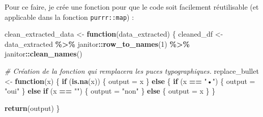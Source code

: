 \documentclass[
  french,
]{book}
\newenvironment{Shaded}{\begin{snugshade}}{\end{snugshade}}
\newcommand{\CommentTok}[1]{\textcolor[rgb]{0.56,0.35,0.01}{\textit{#1}}}
\newcommand{\ControlFlowTok}[1]{\textcolor[rgb]{0.13,0.29,0.53}{\textbf{#1}}}
\newcommand{\DecValTok}[1]{\textcolor[rgb]{0.00,0.00,0.81}{#1}}
\newcommand{\KeywordTok}[1]{\textcolor[rgb]{0.13,0.29,0.53}{\textbf{#1}}}
\newcommand{\NormalTok}[1]{#1}
\newcommand{\OperatorTok}[1]{\textcolor[rgb]{0.81,0.36,0.00}{\textbf{#1}}}
\newcommand{\StringTok}[1]{\textcolor[rgb]{0.31,0.60,0.02}{#1}}
\begin{document}
Pour ce faire, je crée une fonction pour que le code soit facilement
réutilisable (et applicable dans la fonction \texttt{purrr::map}) :

\begin{Shaded}
\begin{Highlighting}[]
\NormalTok{clean\_extracted\_data \textless{}{-}}\StringTok{ }\ControlFlowTok{function}\NormalTok{(data\_extracted) \{}
\NormalTok{  cleaned\_df \textless{}{-}}\StringTok{ }\NormalTok{data\_extracted }\OperatorTok{\%\textgreater{}\%}
\StringTok{    }\NormalTok{janitor}\OperatorTok{::}\KeywordTok{row\_to\_names}\NormalTok{(}\DecValTok{1}\NormalTok{) }\OperatorTok{\%\textgreater{}\%}
\StringTok{    }\NormalTok{janitor}\OperatorTok{::}\KeywordTok{clean\_names}\NormalTok{()}
  
  \CommentTok{\# Création de la fonction qui remplacera les puces typographiques.}
\NormalTok{  replace\_bullet \textless{}{-}}\StringTok{ }\ControlFlowTok{function}\NormalTok{(x) \{}
    \ControlFlowTok{if}\NormalTok{ (}\KeywordTok{is.na}\NormalTok{(x)) \{}
\NormalTok{      output =}\StringTok{ }\NormalTok{x}
\NormalTok{    \} }\ControlFlowTok{else}\NormalTok{ \{}
      \ControlFlowTok{if}\NormalTok{ (x }\OperatorTok{==}\StringTok{ "•"}\NormalTok{) \{}
\NormalTok{        output =}\StringTok{ "oui"}
\NormalTok{      \} }\ControlFlowTok{else} \ControlFlowTok{if}\NormalTok{ (x }\OperatorTok{==}\StringTok{ ""}\NormalTok{) \{}
\NormalTok{        output =}\StringTok{ "non"}
\NormalTok{      \} }\ControlFlowTok{else}\NormalTok{ \{}
\NormalTok{        output =}\StringTok{ }\NormalTok{x}
\NormalTok{      \}}
\NormalTok{    \}}
    
    \KeywordTok{return}\NormalTok{(output)}
\NormalTok{  \}}
  

\end{Highlighting}
\end{Shaded}
\end{document}
